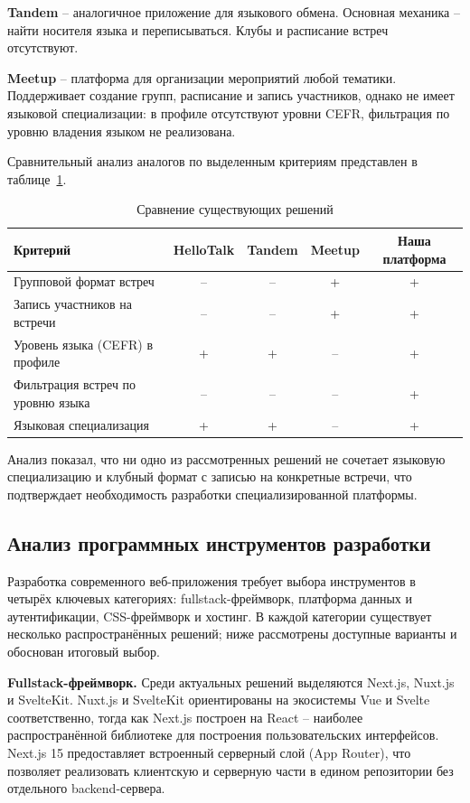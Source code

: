 \textbf{Tandem} -- аналогичное приложение для языкового обмена. Основная механика --
найти носителя языка и переписываться. Клубы и расписание встреч отсутствуют.

\textbf{Meetup} -- платформа для организации мероприятий любой тематики.
Поддерживает создание групп, расписание и запись участников, однако не имеет
языковой специализации: в профиле отсутствуют уровни CEFR, фильтрация по уровню
владения языком не реализована.

Сравнительный анализ аналогов по выделенным критериям представлен в таблице~\ref{tab:analogs}.

\begin{table}[h]
\centering
\caption{Сравнение существующих решений}
\label{tab:analogs}
\begin{tabular}{|p{5.5cm}|c|c|c|c|}
\hline
\textbf{Критерий} & \textbf{HelloTalk} & \textbf{Tandem} & \textbf{Meetup} & \textbf{Наша платформа} \\
\hline
Групповой формат встреч & -- & -- & + & + \\
\hline
Запись участников на встречи & -- & -- & + & + \\
\hline
Уровень языка (CEFR) в профиле & + & + & -- & + \\
\hline
Фильтрация встреч по уровню языка & -- & -- & -- & + \\
\hline
Языковая специализация & + & + & -- & + \\
\hline
\end{tabular}
\end{table}

Анализ показал, что ни одно из рассмотренных решений не сочетает языковую
специализацию и клубный формат с записью на конкретные встречи, что подтверждает
необходимость разработки специализированной платформы.

\subsection{Анализ программных инструментов разработки}

Разработка современного веб-приложения требует выбора инструментов в четырёх
ключевых категориях: fullstack-фреймворк, платформа данных и аутентификации,
CSS-фреймворк и хостинг. В каждой категории существует несколько распространённых
решений; ниже рассмотрены доступные варианты и обоснован итоговый выбор.

\textbf{Fullstack-фреймворк.} Среди актуальных решений выделяются Next.js,
Nuxt.js и SvelteKit. Nuxt.js и SvelteKit ориентированы на экосистемы Vue и Svelte
соответственно, тогда как Next.js построен на React -- наиболее распространённой
библиотеке для построения пользовательских интерфейсов. Next.js 15 предоставляет
встроенный серверный слой (App Router), что позволяет реализовать клиентскую и
серверную части в едином репозитории без отдельного backend-сервера.

